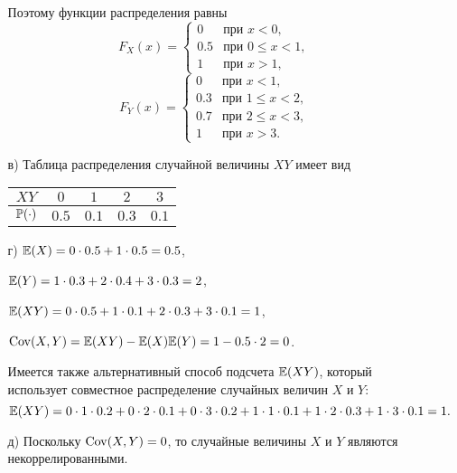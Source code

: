 \begin{enumerate}
\begin{enumerate}
Поэтому функции распределения равны
\[
F_X(x) =
                 \begin{cases}
                     0                   &   \text{при $x < 0$,} \\
                     0.5                 &   \text{при $0 \leq x < 1$,} \\
                     1                   &   \text{при $x > 1$,}
                  \end{cases}
\]
\[
F_Y(x) =
                 \begin{cases}
                     0                   &   \text{при $x < 1$,} \\
                     0.3                 &   \text{при $1 \leq x < 2$,} \\
                     0.7                 &   \text{при $2 \leq x < 3$,} \\
                     1                   &   \text{при $x > 3$.}
                  \end{cases}
\]

\item[в)] Таблица распределения случайной величины $XY$ имеет вид

\begin{center}
\begin{tabular}{@{}ccccc@{}}
\toprule
$XY$        & $0$   & $1$  & $2$  & $3$     \\ \midrule
$\P(\cdot)$ & $0.5$ & $0.1$ & $0.3$ & $0.1$ \\ \bottomrule
\end{tabular}
\end{center}


\item[г)] $\E(X) = 0 \cdot 0.5 + 1 \cdot 0.5 = 0.5$,

$\E(Y) = 1 \cdot 0.3 + 2 \cdot 0.4 + 3 \cdot 0.3 = 2$,

$\E(XY) = 0 \cdot 0.5 + 1 \cdot 0.1 + 2 \cdot 0.3 + 3 \cdot 0.1 = 1$,

$\Cov(X,Y) = \E(XY) - \E(X)\E(Y) = 1 - 0.5 \cdot 2 = 0$.

Имеется также альтернативный способ подсчета $\E(XY)$, который использует совместное распределение случайных величин $X$ и $Y$:
\[
\E(XY) = 0\cdot1\cdot0.2 + 0\cdot2\cdot0.1 + 0\cdot3\cdot0.2 + 1\cdot1\cdot0.1 + 1\cdot2\cdot0.3 + 1\cdot3\cdot0.1 = 1 \text{.}
\]

\item[д)] Поскольку $\Cov(X,Y) = 0$, то случайные величины $X$ и $Y$ являются некоррелированными.


\end{enumerate}
\end{enumerate}
